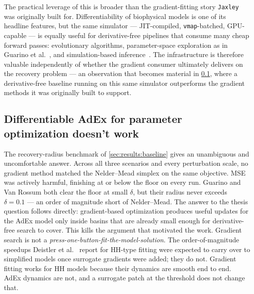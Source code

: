 The practical leverage of this is broader than the gradient-fitting story \texttt{Jaxley} was originally built for.
Differentiability of biophysical models is one of its headline features, but the same simulator --- \gls{JIT}-compiled, \texttt{vmap}-batched, GPU-capable --- is equally useful for derivative-free pipelines that consume many cheap forward passes: evolutionary algorithms, parameter-space exploration as in Guarino et al.~\cite{Guarino2025}, and simulation-based inference~\cite{Goncalves2020}.
The infrastructure is therefore valuable independently of whether the gradient consumer ultimately delivers on the recovery problem --- an observation that becomes material in \cref{sec:discussion:diffadex}, where a derivative-free baseline running on this same simulator outperforms the gradient methods it was originally built to support.

\subsection{Differentiable AdEx for parameter optimization doesn't work}\label{sec:discussion:diffadex}

The recovery-radius benchmark of \cref{sec:results:baseline} gives an unambiguous and uncomfortable answer.
Across all three scenarios and every perturbation scale, no gradient method matched the Nelder--Mead simplex on the same objective.
\gls{MSE} was actively harmful, finishing at or below the floor on every run.
Guarino and Van Rossum both clear the floor at small $\delta$, but their radius never exceeds $\delta=0.1$ --- an order of magnitude short of Nelder--Mead.
The answer to the thesis question follows directly: gradient-based optimization produces useful updates for the \gls{AdEx}
model only inside basins that are already small enough for derivative-free search to cover.
This kills the argument that motivated the work.
Gradient search is not a \emph{press-one-button-fit-the-model-solution}.
The order-of-magnitude speedups Deistler et al.~\cite{Deistler2025} report for \gls{HH}-type fitting were expected to carry over to simplified models once surrogate gradients were added; they do not.
Gradient fitting works for \gls{HH} models because their dynamics are smooth end to end.
\gls{AdEx} dynamics are not, and a surrogate patch at the threshold does not change that.


